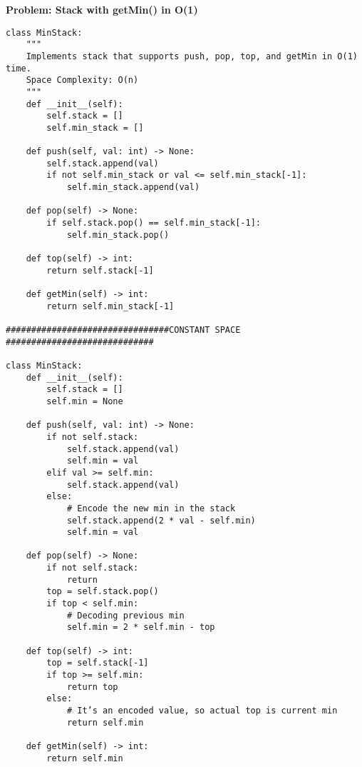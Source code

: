 \noindent\textbf{Problem: Stack with getMin() in O(1)}
\begin{verbatim}
class MinStack:
    """
    Implements stack that supports push, pop, top, and getMin in O(1) time.
    Space Complexity: O(n)
    """
    def __init__(self):
        self.stack = []
        self.min_stack = []

    def push(self, val: int) -> None:
        self.stack.append(val)
        if not self.min_stack or val <= self.min_stack[-1]:
            self.min_stack.append(val)

    def pop(self) -> None:
        if self.stack.pop() == self.min_stack[-1]:
            self.min_stack.pop()

    def top(self) -> int:
        return self.stack[-1]

    def getMin(self) -> int:
        return self.min_stack[-1]

################################CONSTANT SPACE #############################

class MinStack:
    def __init__(self):
        self.stack = []
        self.min = None

    def push(self, val: int) -> None:
        if not self.stack:
            self.stack.append(val)
            self.min = val
        elif val >= self.min:
            self.stack.append(val)
        else:
            # Encode the new min in the stack
            self.stack.append(2 * val - self.min)
            self.min = val

    def pop(self) -> None:
        if not self.stack:
            return
        top = self.stack.pop()
        if top < self.min:
            # Decoding previous min
            self.min = 2 * self.min - top

    def top(self) -> int:
        top = self.stack[-1]
        if top >= self.min:
            return top
        else:
            # It’s an encoded value, so actual top is current min
            return self.min

    def getMin(self) -> int:
        return self.min
\end{verbatim}


